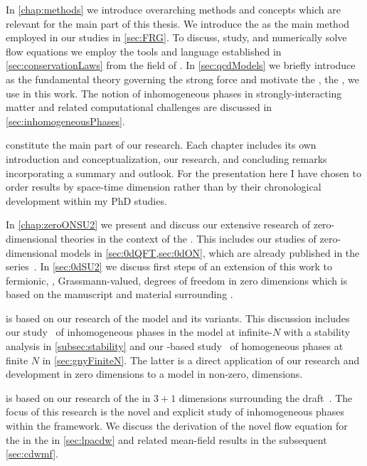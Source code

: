 In \cref{chap:methods} we introduce overarching methods and concepts which are relevant for the main part of this thesis.
We introduce the \frg{} as the main method employed in our studies in \cref{sec:FRG}.
To discuss, study, and numerically solve \frg{} flow equations we employ the tools and language established in \cref{sec:conservationLaws} from the field of \cfd{}.
In \cref{sec:qcdModels} we briefly introduce \qcd{} as the fundamental theory governing the strong force and motivate the \loeft{}, \viz{} the \qmm{}, we use in this work.
The notion of inhomogeneous phases in strongly-interacting matter and related computational challenges are discussed in \cref{sec:inhomogeneousPhases}.\bigskip

 constitute the main part of our research.
Each chapter includes its own introduction and conceptualization, our research, and concluding remarks \dash{} incorporating a summary and outlook.
For the presentation here I have chosen to order results by space-time dimension rather than by their chronological development within my PhD studies.

In \cref{chap:zeroONSU2} we present and discuss our extensive research of zero-dimensional theories in the context of the \frg{}.
This includes our studies of zero-dimensional \ON{} models in \cref{sec:0dQFT,sec:0dON}, which are already published in the series~\cite{Koenigstein:2021syz,Koenigstein:2021rxj,Steil:2021cbu}.
In \cref{sec:0dSU2} we discuss first steps of an extension of this work to fermionic, \ie{}, Grassmann-valued, degrees of freedom in zero dimensions which is based on the manuscript and material surrounding .

 is based on our research of the \gn{} model and its variants.
This discussion includes our study~\cite{Koenigstein:2021llr} of inhomogeneous phases in the \gn{} model at infinite-$N$ with a stability analysis in \cref{subsec:stability} and our \frg{}-based study~\cite{Stoll:2021ori} of homogeneous phases at finite $N$ in \cref{sec:gnyFiniteN}.
The latter is a direct application of our research and development in zero dimensions to a model in non-zero, \viz{}  dimensions.

 is based on our research of the \qmm{} in $3+1$ dimensions surrounding the draft~\cite{Steil:2023RGMF}.
The focus of this research is the novel and explicit study of inhomogeneous phases within the \frg{} framework.
We discuss the derivation of the novel \lpa{} flow equation for the \cdw{} in the \qmm{} in \cref{sec:lpacdw} and related mean-field results in the subsequent \cref{sec:cdwmf}.\bigskip

